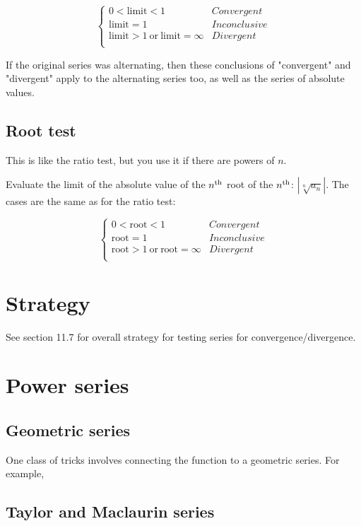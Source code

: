 $$
\begin{cases}
0 < \text{limit} < 1&Convergent\\
\text{limit} = 1&Inconclusive\\
\text{limit} > 1 ~\text{or}~ \text{limit} = \infty&Divergent\\
\end{cases}
$$

If the original series was alternating, then these conclusions of "convergent" and "divergent" apply to the alternating series too, as well as the series of absolute values.


\subsection{Root test}
This is like the ratio test, but you use it if there are powers of $n$.

Evaluate the limit of the absolute value of the $n^{\text{th}}$ root of the $n^{\text{th}}$: $|\sqrt[n]{a_n}|$. The cases are the same as for the ratio test:


$$
\begin{cases}
0 < \text{root} < 1&Convergent\\
\text{root} = 1&Inconclusive\\
\text{root} > 1 ~\text{or}~ \text{root} = \infty&Divergent\\
\end{cases}
$$


\section{Strategy}

See section 11.7 for overall strategy for testing series for convergence/divergence.


\section{Power series}

\subsection{Geometric series}

One class of tricks involves connecting the function to a geometric series. For example,

\subsection{Taylor and Maclaurin series}

